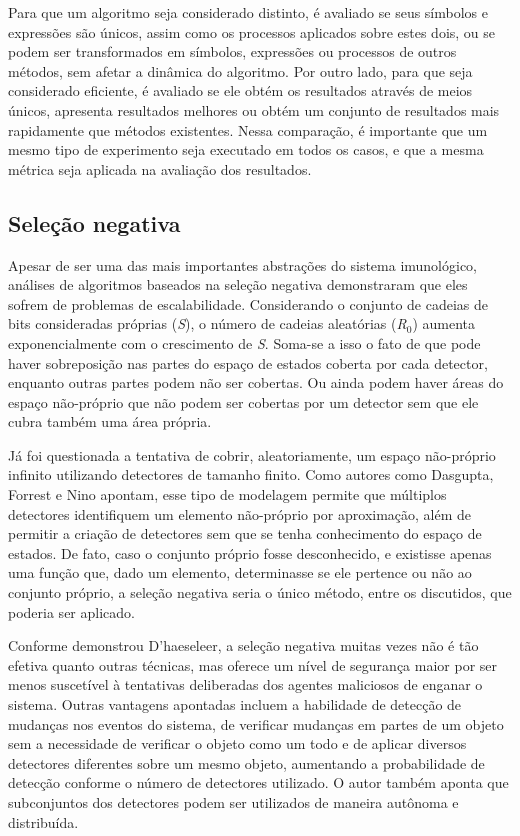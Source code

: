 Para que um algoritmo seja considerado distinto, é avaliado se seus símbolos e expressões são únicos, assim como os processos aplicados sobre estes dois, ou se podem ser transformados em símbolos, expressões ou processos de outros métodos, sem afetar a dinâmica do algoritmo. Por outro lado, para que seja considerado eficiente, é avaliado se ele obtém os resultados através de meios únicos, apresenta resultados melhores ou obtém um conjunto de resultados mais rapidamente que métodos existentes. Nessa comparação, é importante que um mesmo tipo de experimento seja executado em todos os casos, e que a mesma métrica seja aplicada na avaliação dos resultados.

\subsection{Seleção negativa}

Apesar de ser uma das mais importantes abstrações do sistema imunológico, análises de algoritmos baseados na seleção negativa demonstraram que eles sofrem de problemas de escalabilidade. Considerando o conjunto de cadeias de bits consideradas próprias (\emph{S}), o número de cadeias aleatórias (\emph{R$_{0}$}) aumenta exponencialmente com o crescimento de \emph{S}. Soma-se a isso o fato de que pode haver sobreposição nas partes do espaço de estados coberta por cada detector, enquanto outras partes podem não ser cobertas. Ou ainda podem haver áreas do espaço não-próprio que não podem ser cobertas por um detector sem que ele cubra também uma área própria.

Já foi questionada a tentativa de cobrir, aleatoriamente, um espaço não-próprio infinito utilizando detectores de tamanho finito. Como autores como Dasgupta, Forrest e Nino apontam, esse tipo de modelagem permite que múltiplos detectores identifiquem um elemento não-próprio por aproximação, além de permitir a criação de detectores sem que se tenha conhecimento do espaço de estados. De fato, caso o conjunto próprio fosse desconhecido, e existisse apenas uma função que, dado um elemento, determinasse se ele pertence ou não ao conjunto próprio, a seleção negativa seria o único método, entre os discutidos, que poderia ser aplicado.

Conforme demonstrou D’haeseleer, a seleção negativa muitas vezes não é tão efetiva quanto outras técnicas, mas oferece um nível de segurança maior por ser menos suscetível à tentativas deliberadas dos agentes maliciosos de enganar o sistema. Outras vantagens apontadas incluem a habilidade de detecção de mudanças nos eventos do sistema, de verificar mudanças em partes de um objeto sem a necessidade de verificar o objeto como um todo e de aplicar diversos detectores diferentes sobre um mesmo objeto, aumentando a probabilidade de detecção conforme o número de detectores utilizado. O autor também aponta que subconjuntos dos detectores podem ser utilizados de maneira autônoma e distribuída.


